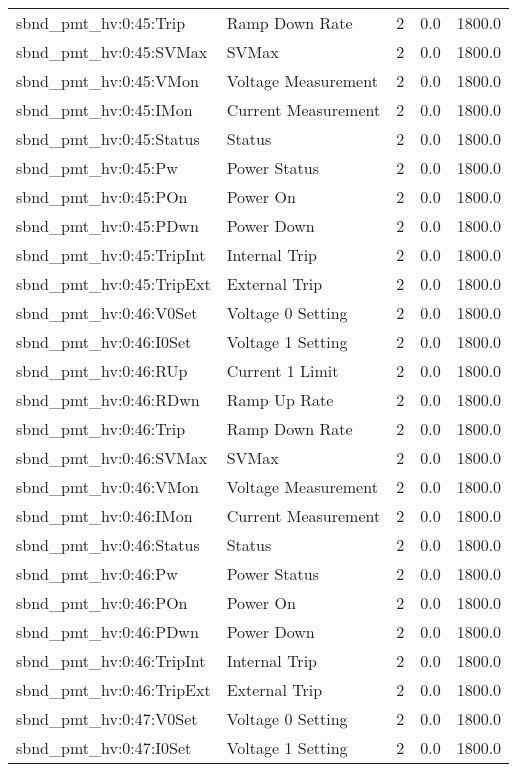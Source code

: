 \begin{center}
\begin{longtable}{l | l l l l }
sbnd\_pmt\_hv:0:45:Trip & Ramp Down Rate & 2 & 0.0 & 1800.0\\ 
sbnd\_pmt\_hv:0:45:SVMax & SVMax & 2 & 0.0 & 1800.0\\ 
sbnd\_pmt\_hv:0:45:VMon & Voltage Measurement & 2 & 0.0 & 1800.0\\ 
sbnd\_pmt\_hv:0:45:IMon & Current Measurement & 2 & 0.0 & 1800.0\\ 
sbnd\_pmt\_hv:0:45:Status & Status & 2 & 0.0 & 1800.0\\ 
sbnd\_pmt\_hv:0:45:Pw & Power Status & 2 & 0.0 & 1800.0\\ 
sbnd\_pmt\_hv:0:45:POn & Power On & 2 & 0.0 & 1800.0\\ 
sbnd\_pmt\_hv:0:45:PDwn & Power Down & 2 & 0.0 & 1800.0\\ 
sbnd\_pmt\_hv:0:45:TripInt & Internal Trip & 2 & 0.0 & 1800.0\\ 
sbnd\_pmt\_hv:0:45:TripExt & External Trip & 2 & 0.0 & 1800.0\\ 
sbnd\_pmt\_hv:0:46:V0Set & Voltage 0 Setting & 2 & 0.0 & 1800.0\\ 
sbnd\_pmt\_hv:0:46:I0Set & Voltage 1 Setting & 2 & 0.0 & 1800.0\\ 
sbnd\_pmt\_hv:0:46:RUp & Current 1 Limit & 2 & 0.0 & 1800.0\\ 
sbnd\_pmt\_hv:0:46:RDwn & Ramp Up Rate & 2 & 0.0 & 1800.0\\ 
sbnd\_pmt\_hv:0:46:Trip & Ramp Down Rate & 2 & 0.0 & 1800.0\\ 
sbnd\_pmt\_hv:0:46:SVMax & SVMax & 2 & 0.0 & 1800.0\\ 
sbnd\_pmt\_hv:0:46:VMon & Voltage Measurement & 2 & 0.0 & 1800.0\\ 
sbnd\_pmt\_hv:0:46:IMon & Current Measurement & 2 & 0.0 & 1800.0\\ 
sbnd\_pmt\_hv:0:46:Status & Status & 2 & 0.0 & 1800.0\\ 
sbnd\_pmt\_hv:0:46:Pw & Power Status & 2 & 0.0 & 1800.0\\ 
sbnd\_pmt\_hv:0:46:POn & Power On & 2 & 0.0 & 1800.0\\ 
sbnd\_pmt\_hv:0:46:PDwn & Power Down & 2 & 0.0 & 1800.0\\ 
sbnd\_pmt\_hv:0:46:TripInt & Internal Trip & 2 & 0.0 & 1800.0\\ 
sbnd\_pmt\_hv:0:46:TripExt & External Trip & 2 & 0.0 & 1800.0\\ 
sbnd\_pmt\_hv:0:47:V0Set & Voltage 0 Setting & 2 & 0.0 & 1800.0\\ 
sbnd\_pmt\_hv:0:47:I0Set & Voltage 1 Setting & 2 & 0.0 & 1800.0\\ 

\end{longtable}
\end{center}
